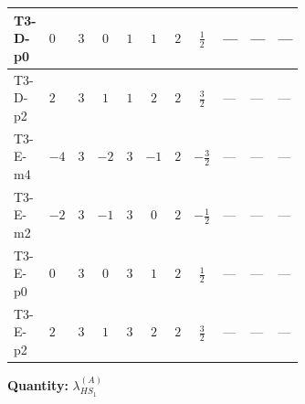 \documentclass[8pt]{article}
\begin{document}
\begin{landscape}
\begin{longtable}{@{}llcccccc >{\raggedright\arraybackslash}p{0.21\linewidth} >{\raggedright\arraybackslash}p{0.21\linewidth} >{\raggedright\arraybackslash}p{0.21\linewidth}@{}}
T3-D-p0 & $0$ & $3$ & $0$ & $1$ & $1$ & $2$ & $\frac{1}{2}$ & --- & --- & --- \\
\midrule
T3-D-p2 & $2$ & $3$ & $1$ & $1$ & $2$ & $2$ & $\frac{3}{2}$ & --- & --- & --- \\
\midrule
T3-E-m4 & $-4$ & $3$ & $-2$ & $3$ & $-1$ & $2$ & $-\frac{3}{2}$ & --- & --- & --- \\
\midrule
T3-E-m2 & $-2$ & $3$ & $-1$ & $3$ & $0$ & $2$ & $-\frac{1}{2}$ & --- & --- & --- \\
\midrule
T3-E-p0 & $0$ & $3$ & $0$ & $3$ & $1$ & $2$ & $\frac{1}{2}$ & --- & --- & --- \\
\midrule
T3-E-p2 & $2$ & $3$ & $1$ & $3$ & $2$ & $2$ & $\frac{3}{2}$ & --- & --- & --- \\
\midrule
\bottomrule
\end{longtable}
\clearpage
\noindent\textbf{Quantity: }$\lambda_{HS_1}^{(A)}$\par\smallskip

\end{landscape}
\end{document}
